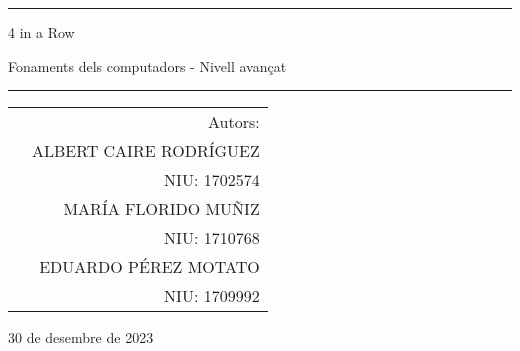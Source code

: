 \begin{titlepage}
\scshape

\centering
\vspace{1cm}
\raisebox{-\baselineskip}{\rule{\textwidth}{1px}}
\rule{\textwidth}{1px}
\vspace{0.01cm}

{\huge{{4 in a Row}}}\par \vspace{0.1cm}
Fonaments dels computadors - Nivell avançat

\rule{\textwidth}{2px}

\vspace{1cm}

\begin{tabularx}{\textwidth}{X r}
 & Autors:\\
 & \large{ALBERT CAIRE RODRÍGUEZ} \\
 & NIU: 1702574 \\
 & \large{MARÍA FLORIDO MUÑIZ} \\
 & NIU: 1710768 \\
 & \large{EDUARDO PÉREZ MOTATO} \\
 & NIU: 1709992 \\
\end{tabularx}

\vspace{1.3cm}


\vfill

30 de desembre de 2023

\end{titlepage}
